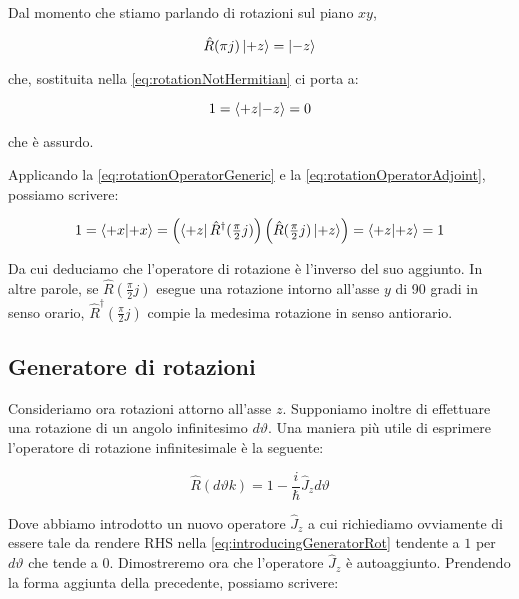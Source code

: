 Dal momento che stiamo parlando di rotazioni sul piano $xy$,

	\begin{equation}
		\hat{R}(\pi j ) \ket{+z} = \ket{-z}
	\end{equation}

che, sostituita nella \eqref{eq:rotationNotHermitian} ci porta a:

	\begin{equation}
		1 = \braket{+z}{-z} = 0
	\end{equation}

che \`e assurdo.

Applicando la \eqref{eq:rotationOperatorGeneric} e la \eqref{eq:rotationOperatorAdjoint}, possiamo scrivere:

	\begin{equation}
		1 = \braket{+x}{+x} = \left ( \bra{+z} \hat{R}^\dagger(\tfrac{\pi}{2} j) \right ) \left ( \hat{R}(\tfrac{\pi}{2} j) \ket{+z} \right ) = \braket{+z}{+z} = 1
	\end{equation}

Da cui deduciamo che l'operatore di rotazione \`e l'inverso del suo aggiunto. In altre parole, se $\hat{R}(\tfrac{\pi}{2} j)$ esegue una rotazione intorno all'asse $y$ di 90 gradi in senso orario, $\hat{R}^\dagger(\tfrac{\pi}{2} j) $ compie la medesima rotazione in senso antiorario. \\

\subsection{Generatore di rotazioni}

Consideriamo ora rotazioni attorno all'asse $z$. Supponiamo inoltre di effettuare una rotazione di un angolo infinitesimo $d \vartheta$. Una maniera pi\`u utile di esprimere l'operatore di rotazione infinitesimale \`e la seguente:

	\begin{equation} \label{eq:introducingGeneratorRot}
		\hat{R} ( { d \vartheta k } ) = 1 - \frac{i}{\hbar} \hat{J}_z d \vartheta
	\end{equation}

Dove abbiamo introdotto un nuovo operatore $\hat{J}_z$ a cui richiediamo ovviamente di essere tale da rendere RHS nella \eqref{eq:introducingGeneratorRot} tendente a $1$ per $d \vartheta$ che tende a $0$. Dimostreremo ora che l'operatore $\hat{J}_z$ \`e autoaggiunto. Prendendo la forma aggiunta della precedente, possiamo scrivere:

